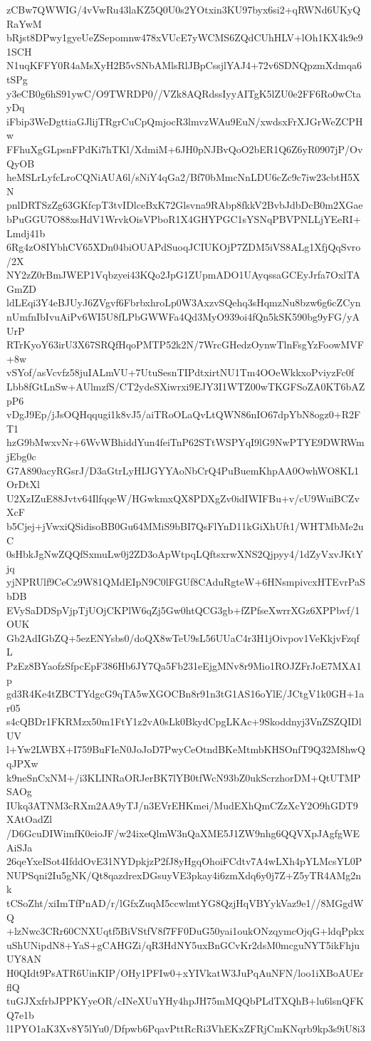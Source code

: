 zCBw7QWWIG/4vVwRu43laKZ5Q0U0s2YOtxin3KU97byx6si2+qRWNd6UKyQRaYwM
bRjst8DPwy1gyeUeZSepomnw478xVUcE7yWCMS6ZQdCUhHLV+lOh1KX4k9e91SCH
N1uqKFFY0R4aMsXyH2B5vSNbAMlsRlJBpCssjlYAJ4+72v6SDNQpzmXdmqa6tSPg
y3eCB0g6hS91ywC/O9TWRDP0//VZk8AQRdssIyyAITgK5lZU0e2FF6Ro0wCtayDq
iFbip3WeDgttiaGJlijTRgrCuCpQmjocR3lmvzWAu9EuN/xwdsxFrXJGrWeZCPHw
FFhuXgGLpsnFPdKi7hTKl/XdmiM+6JH0pNJBvQoO2bER1Q6Z6yR0907jP/OvQyOB
heMSLrLyfcLroCQNiAUA6l/sNiY4qGa2/Bf70bMmcNnLDU6cZc9c7iw23cbtH5XN
pnlDRTSzZg63GKfcpT3tvIDlceBxK72Glsvna9RAbp8fkkV2BvbJdbDcB0m2XGae
bPuGGU7O88xsHdV1WrvkOisVPboR1X4GHYPGC1sYSNqPBVPNLLjYEeRI+Lmdj41b
6Rg4zO8IYbhCV65XDn04biOUAPdSuoqJCIUKOjP7ZDM5iVS8ALg1XfjQqSvro/2X
NY2zZ0rBmJWEP1Vqbzyei43KQo2JpG1ZUpmADO1UAyqssaGCEyJrfa7OxlTAGmZD
ldLEqi3Y4eBJUyJ6ZVgvf6FbrbxhroLp0W3AxzvSQehq3sHqmzNu8bzw6g6cZCyn
nUmfnIbIvuAiPv6WI5U8fLPbGWWFa4Qd3MyO939oi4fQn5kSK590bg9yFG/yAUrP
RTrKyoY63irU3X67SRQfHqoPMTP52k2N/7WrcGHedzOynwTlnFsgYzFoowMVF+8w
vSYof/asVcvfz58juIALmVU+7UtuSesnTIPdtxirtNU1Tm4OOeWkkxoPviyzFc0f
Lbb8fGtLnSw+AUlmzfS/CT2ydeSXiwrxi9EJY3I1WTZ00wTKGFSoZA0KT6bAZpP6
vDgJ9Ep/jJsOQHqqugi1k8vJ5/aiTRoOLaQvLtQWN86nIO67dpYbN8ogz0+R2FT1
hzG9bMwxvNr+6WvWBhiddYun4feiTnP62STtWSPYqI9lG9NwPTYE9DWRWmjEbg0c
G7A890acyRGsrJ/D3aGtrLyHIJGYYAoNbCrQ4PuBuemKhpAA0OwhWO8KL1OrDtXl
U2XzIZuE88Jvtv64IlfqqeW/HGwkmxQX8PDXgZv0idIWIFBu+v/cU9WuiBCZvXcF
b5Cjej+jVwxiQSidisoBB0Gu64MMiS9bBI7QsFlYnD11kGiXhUft1/WHTMbMe2uC
0sHbkJgNwZQQfSxmuLw0j2ZD3oApWtpqLQftsxrwXNS2Qjpyy4/1dZyVxvJKtYjq
yjNPRUlf9CeCz9W81QMdEIpN9C0lFGUf8CAduRgteW+6HNsmpivcxHTEvrPaSbDB
EVySaDDSpVjpTjUOjCKPlW6qZj5Gw0htQCG3gb+fZPfseXwrrXGz6XPPbvf/1OUK
Gb2AdIGbZQ+5ezENYsbs0/doQX8wTeU9sL56UUaC4r3H1jOivpov1VeKkjvFzqfL
PzEz8BYaofzSfpcEpF386Hb6JY7Qa5Fb231eEjgMNv8r9Mio1ROJZFrJoE7MXA1p
gd3R4Ke4tZBCTYdgcG9qTA5wXGOCBn8r91n3tG1AS16oYlE/JCtgV1k0GH+1ar05
s4cQBDr1FKRMzx50m1FtY1z2vA0sLk0BkydCpgLKAc+9Skoddnyj3VnZSZQIDlUV
l+Yw2LWBX+I759BuFIeN0JoJoD7PwyCeOtndBKeMtmbKHSOnfT9Q32M8hwQqJPXw
k9neSnCxNM+/i3KLINRaORJerBK7lYB0tfWcN93bZ0ukScrzhorDM+QtUTMPSAOg
IUkq3ATNM3cRXm2AA9yTJ/n3EVrEHKmei/MudEXhQmCZzXcY2O9hGDT9XAtOadZl
/D6GcuDIWimfK0eioJF/w24ixeQlmW3nQaXME5J1ZW9nhg6QQVXpJAgfgWEAiSJa
26qeYxeISot4IfddOvE31NYDpkjzP2fJ8yHgqOhoiFCdtv7A4wLXh4pYLMcsYL0P
NUPSqni2Iu5gNK/Qt8qazdrexDGsuyVE3pkay4i6zmXdq6y0j7Z+Z5yTR4AMg2nk
tCSoZht/xiImTfPnAD/r/lGfxZuqM5ccwlmtYG8QzjHqVBYykVaz9e1//8MGgdWQ
+lzNwc3CRr60CNXUqtf5BiVStfV8f7FF0DuG50yai1oukONzqymcOjqG+ldqPpkx
uShUNipdN8+YaS+gCAHGZi/qR3HdNY5uxBnGCvKr2dsM0mcguNYT5ikFhjuUY8AN
H0QIdt9PsATR6UinKIP/OHy1PFIw0+xYIVkatW3JuPqAuNFN/loo1iXBoAUErflQ
tuGJXxfrbJPPKYyeOR/cINeXUuYHy4hpJH75mMQQbPLdTXQhB+lu6lsnQFKQ7e1b
l1PYO1aK3Xv8Y5lYu0/Dfpwb6PqavPttRcRi3VhEKxZFRjCmKNqrb9kp3s9iU8i3
